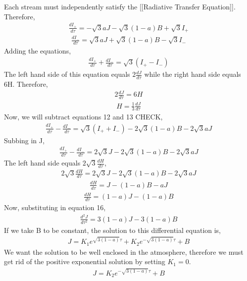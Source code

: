 \documentclass{article}
\begin{document}
Each stream must independently satisfy the [[Radiative Transfer Equation]]. Therefore,
\begin{align}
\frac{dI_{+}}{d\tau} = -\sqrt{3}aJ - \sqrt{3}(1-a)B + \sqrt{3}I_{+}
\end{align}
\begin{align}
\frac{dI_{-}}{d\tau} = \sqrt{3}aJ + \sqrt{3}(1-a)B - \sqrt{3}I_{-}
\end{align}
Adding the equations,
\begin{align}
\frac{dI_{+}}{d\tau} + \frac{dI_{-}}{d\tau} = \sqrt{3}(I_{+} - I_{-})
\end{align}
The left hand side of this equation equals $2 \frac{dJ}{d \tau}$ while the right hand side equals 6H. Therefore,
\begin{align}
2 \frac{dJ}{d \tau} = 6H
\end{align}
\begin{align}
H = \frac{1}{3} \frac{dJ}{d \tau}
\end{align}
Now, we will subtract equations 12 and 13 CHECK,
\begin{align}
\frac{dI_{+}}{d\tau} - \frac{dI_{-}}{d\tau} = \sqrt{3}(I_{+} +I_{-}) - 2 \sqrt{3}(1-a)B - 2 \sqrt{3} aJ
\end{align}
Subbing in J,
\begin{align}
\frac{dI_{+}}{d\tau} - \frac{dI_{-}}{d\tau} = 2 \sqrt{3}J - 2 \sqrt{3}(1-a)B - 2 \sqrt{3} aJ
\end{align}
The left hand side equals $2 \sqrt{3} \frac{dH}{d \tau} $,
\begin{align}
 2 \sqrt{3} \frac{dH}{d \tau}= 2 \sqrt{3}J - 2 \sqrt{3}(1-a)B - 2 \sqrt{3} aJ
\end{align}
\begin{align}
 \frac{dH}{d \tau}= J - (1-a)B -  aJ
\end{align}
\begin{align}
 \frac{dH}{d \tau}= (1-a)J - (1-a)B 
\end{align}
Now, substituting in equation 16,
\begin{align}
\frac{d^2J}{d \tau^2} = 3(1-a)J - 3(1-a)B
\end{align}
If we take B to be constant, the solution to this differential equation is,
\begin{align}
J = K_1 e^{\sqrt{3(1-a)} \tau} + K_2 e^{-\sqrt{3(1-a)}\tau} +B
\end{align}
We want the solution to be well enclosed in the atmosphere, therefore we must get rid of the positive exponential solution by setting $K_1 = 0$.
\begin{align}
J =K_2 e^{-\sqrt{3(1-a)}\tau} +B
\end{align}
\end{document}
